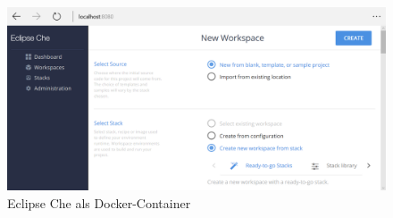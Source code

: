 \begin{figure}[htbp]
    \centering
    \includegraphics[width=0.9\linewidth,clip]{images/eclipse-che-demo}
    \caption{Eclipse Che als Docker-Container}
\label{fig:eclipse-che-demo}
\end{figure}



